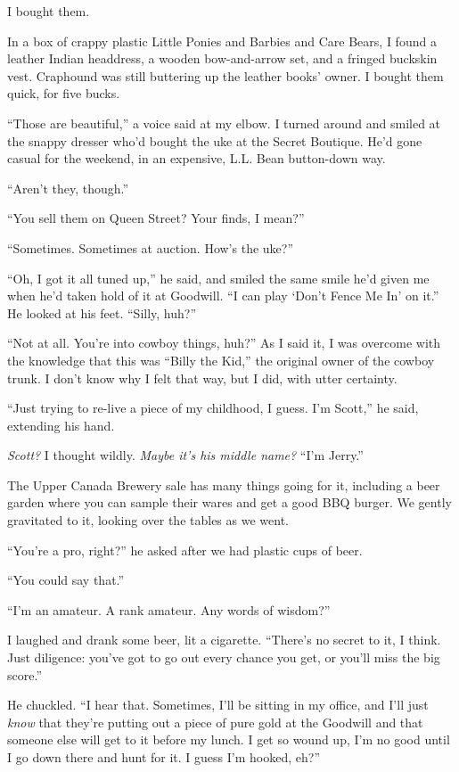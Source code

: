 I bought them.

In a box of crappy plastic Little Ponies and Barbies and Care
Bears, I found a leather Indian headdress, a wooden bow-and-arrow
set, and a fringed buckskin vest. Craphound was still buttering up
the leather books' owner. I bought them quick, for five bucks.

``Those are beautiful,'' a voice said at my elbow. I turned around
and smiled at the snappy dresser who'd bought the uke at the Secret
Boutique. He'd gone casual for the weekend, in an expensive, L.L.
Bean button-down way.

``Aren't they, though.''

``You sell them on Queen Street? Your finds, I mean?''

``Sometimes. Sometimes at auction. How's the uke?''

``Oh, I got it all tuned up,'' he said, and smiled the same smile
he'd given me when he'd taken hold of it at Goodwill.
``I can play `Don't Fence Me In' on it.'' He looked at his feet.
``Silly, huh?''

``Not at all. You're into cowboy things, huh?'' As I said it, I was
overcome with the knowledge that this was ``Billy the Kid,'' the
original owner of the cowboy trunk. I don't know why I felt that
way, but I did, with utter certainty.

``Just trying to re-live a piece of my childhood, I guess. I'm Scott,''
he said, extending his hand.

\emph{Scott?} I thought wildly. \emph{Maybe it's his middle name?}
``I'm Jerry.''

The Upper Canada Brewery sale has many things going for it,
including a beer garden where you can sample their wares and get a
good BBQ burger. We gently gravitated to it, looking over the
tables as we went.

``You're a pro, right?'' he asked after we had plastic cups of
beer.

``You could say that.''

``I'm an amateur. A rank amateur. Any words of wisdom?''

I laughed and drank some beer, lit a cigarette.
``There's no secret to it, I think. Just diligence: you've got to go 
out every chance you get, or you'll miss the big score.''

He chuckled.
``I hear that. Sometimes, I'll be sitting in my office, and I'll 
just \emph{know} that they're putting out a piece of pure gold at 
the Goodwill and that someone else will get to it before my lunch. 
I get so wound up, I'm no good until I go down there and hunt for it. 
I guess I'm hooked, eh?''

